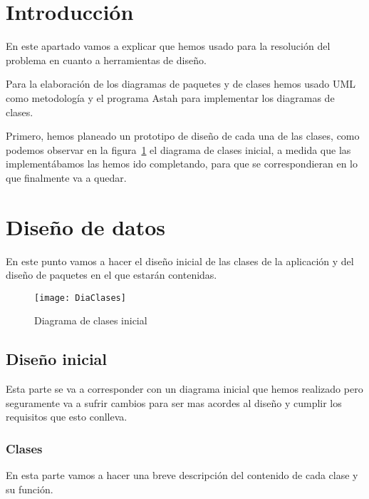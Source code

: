 
\section{Introducción}

En este apartado vamos a explicar que hemos usado para la resolución del problema en cuanto a herramientas de diseño.

Para la elaboración de los diagramas de paquetes y de clases hemos usado UML como metodología y el programa Astah para implementar los diagramas de clases.

Primero, hemos planeado un prototipo de diseño de cada una de las clases, como podemos observar en la figura~\ref{fig:C.1.1} el diagrama de clases inicial, a medida que las implementábamos las hemos ido completando, para que se correspondieran en lo que finalmente va a quedar.



\section{Diseño de datos}

En este punto vamos a hacer el diseño inicial de las clases de la aplicación y del diseño de paquetes en el que estarán contenidas.

\begin{figure}[h]
	\centering
	\texttt{[image: DiaClases]}
	\caption{Diagrama de clases inicial}
	\label{fig:C.1.1}
\end{figure}
 
\subsection{Diseño inicial}
Esta parte se va a corresponder con un diagrama inicial que hemos realizado pero seguramente va a sufrir cambios para ser mas acordes al diseño y cumplir los requisitos que esto conlleva. 
\subsubsection{Clases}
En esta parte vamos a hacer una breve descripción del contenido de cada clase y su función.

